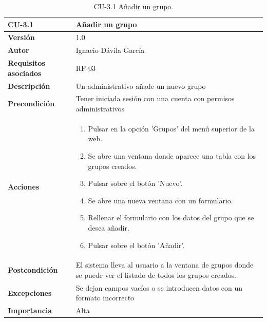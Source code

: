 \begin{table}[p]
	\centering
	\begin{tabularx}{\linewidth}{ p{} p{} }
		\toprule
		\textbf{CU-3.1}    & \textbf{Añadir un grupo}\\
		\toprule
		\textbf{Versión}              & 1.0    \\
		\textbf{Autor}                & Ignacio Dávila García \\
		\textbf{Requisitos asociados} & RF-03 \\
		\textbf{Descripción}          & Un administrativo añade un nuevo grupo \\
		\textbf{Precondición}         & Tener iniciada sesión con una cuenta con permisos administrativos \\
		\textbf{Acciones}             &
		\begin{enumerate}
			\def\labelenumi{\arabic{enumi}.}
			\tightlist
			\item Pulsar en la opción 'Grupos' del menú superior de la web.
			\item Se abre una ventana donde aparece una tabla con los grupos creados.
			\item Pulsar sobre el botón 'Nuevo'.
			\item Se abre una nueva ventana con un formulario.
			\item Rellenar el formulario con los datos del grupo que se desea añadir.
			\item Pulsar sobre el botón 'Añadir'.
		\end{enumerate}\\
		\textbf{Postcondición}        & El sistema lleva al usuario a la ventana de grupos donde se puede ver el listado de todos los grupos creados. \\
		\textbf{Excepciones}          & Se dejan campos vacíos o se introducen datos con un formato incorrecto \\
		\textbf{Importancia}          & Alta \\
		\bottomrule
	\end{tabularx}
	\caption{CU-3.1 Añadir un grupo.}
\end{table}

